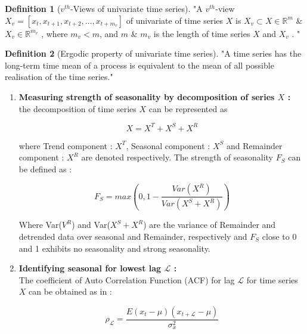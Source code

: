 \documentclass[a4paper, fleqn]{cas-sc}
\theoremstyle{definition}
\newtheorem{definition}{Definition}[section]
\theoremstyle{remark}
\begin{document}
  \begin{definition}[$v^{th}$-Views of univariate time series]\label{v uts}
    "A $v^{th}$-view $X_v=[ x_t, x_{t+1}, x_{t+2}, \dots, x_{t+m_v} ]$ of univariate of time series $X$ is $X_v \subset X \in \mathbb{R}^{m}$ \& $X_v \in \mathbb{R}^{m_v}$ ,  where $m_{v} < m$,  and $m$ \& $m_v$ is the length of time series $X$ and $X_v$ . "
  \end{definition}

  \begin{definition}[Ergodic property of univariate time series]\label{ep uv}
    "A time series has the long-term time mean of a process is equivalent to the mean of all possible realisation of the time series."    
  \end{definition}

\begin{enumerate}[label=(\alph*)]

\item \textbf{Measuring strength of seasonality by decomposition of series $X$ :}\\
the decomposition of time series $X$ can be represented  as 

\begin{equation}
  \label{x}
  X = X^T + X^S +X^R
\end{equation}

where Trend component : $X^T$,  Seasonal component :  $X^S$ and Remainder component :  $X^R$ are denoted respectively. 
The strength of seasonality $F_S$ can be defined as : 

\begin{equation}\label{fs}
  F_S=max \left(0, 1- \frac{Var (X^R)}{Var(X^S + X^R)} \right)
\end{equation}

Where Var($V^R$) and Var($X^S + X^R$) are the variance of Remainder and detrended data over seasonal and Remainder, respectively and $F_S$ close to 0 and 1 exhibits no seasonality and strong seasonality.

\item \textbf{Identifying seasonal for lowest lag $\mathscr{L}$ :} \\
The coefficient of Auto Correlation Function (ACF) for lag $\mathscr{L}$ for time series $X$ can be obtained as in : 

\begin{equation}
  \label{rovh}
  \rho_{\mathscr{L}}=\frac{E(x_t - \mu)(x_{t+ \mathscr{L}}-\mu)}{\sigma_x^2}
\end{equation}


\end{enumerate}
\end{document}

